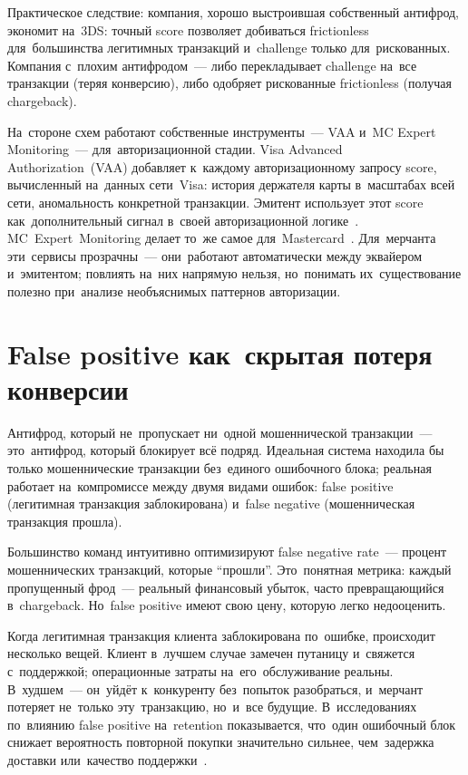 Практическое следствие: компания, хорошо выстроившая собственный антифрод,
экономит на~3DS: точный score позволяет добиваться frictionless для~большинства
легитимных транзакций и~challenge только для~рискованных. Компания
с~плохим антифродом~--- либо перекладывает challenge на~все транзакции
(теряя конверсию), либо одобряет рискованные frictionless (получая
chargeback).

На~стороне схем работают собственные инструменты~--- VAA и~MC Expert Monitoring~--- для~авторизационной
стадии. Visa Advanced Authorization~(VAA) добавляет к~каждому авторизационному
запросу score, вычисленный на~данных сети~Visa: история держателя карты
в~масштабах всей сети, аномальность конкретной транзакции. Эмитент
использует этот score как~дополнительный сигнал в~своей авторизационной
логике~. MC~Expert~Monitoring делает то~же самое
для~Mastercard~. Для~мерчанта эти~сервисы прозрачны~---
они~работают автоматически между эквайером и~эмитентом; повлиять на~них
напрямую нельзя, но~понимать их~существование полезно при~анализе
необъяснимых паттернов авторизации.


\section{False positive как~скрытая потеря конверсии}
\label{sec:fraud-false-positive}

Антифрод, который не~пропускает ни~одной мошеннической транзакции~---
это~антифрод, который блокирует всё подряд. Идеальная система находила
бы только мошеннические транзакции без~единого ошибочного блока; реальная
работает на~компромиссе между двумя видами ошибок: false positive (легитимная
транзакция заблокирована) и~false negative (мошенническая транзакция
прошла).

Большинство команд интуитивно оптимизируют false negative rate~---
процент мошеннических транзакций, которые \enquote{прошли}. Это~понятная
метрика: каждый пропущенный фрод~--- реальный финансовый убыток, часто
превращающийся в~chargeback. Но~false positive имеют свою цену, которую
легко недооценить.

Когда легитимная транзакция клиента заблокирована по~ошибке, происходит
несколько вещей. Клиент в~лучшем случае замечен путаницу и~свяжется
с~поддержкой; операционные затраты на~его~обслуживание реальны. В~худшем~---
он~уйдёт к~конкуренту без~попыток разобраться, и~мерчант потеряет
не~только эту~транзакцию, но~и~все будущие. В~исследованиях по~влиянию
false positive на~retention показывается, что~один ошибочный блок
снижает вероятность повторной покупки значительно сильнее, чем~задержка
доставки или~качество поддержки~.

